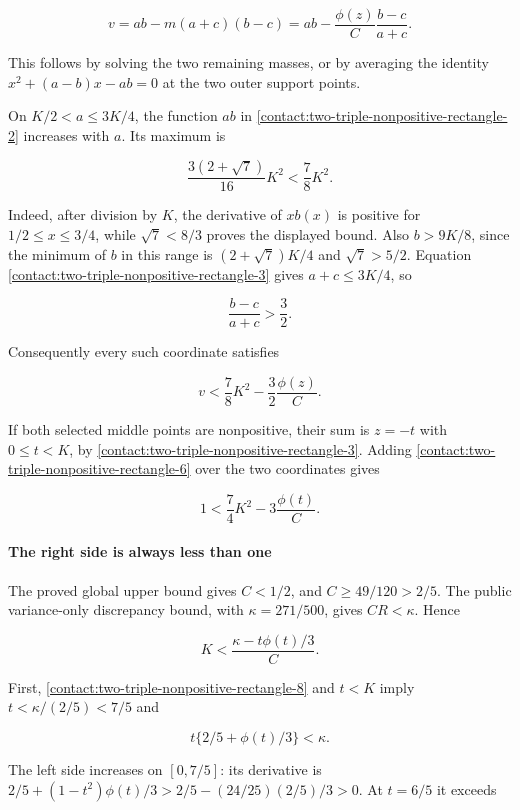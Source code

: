 \[
 v=ab-m(a+c)(b-c)
   =ab-\frac{\phi(z)}C\frac{b-c}{a+c}.
\tag{B.7.5}\label{contact:two-triple-nonpositive-rectangle-5}
\]

This follows by solving the two remaining masses, or by averaging
the identity $x^2+(a-b)x-ab=0$ at the two outer support points.

On $K/2<a\le 3K/4$, the function $ab$ in \eqref{contact:two-triple-nonpositive-rectangle-2} increases with $a$. Its
maximum is

\[
 \frac{3(2+\sqrt7)}{16}K^2<\frac78K^2.
\]

Indeed, after division by $K$, the derivative of $x b(x)$ is positive
for $1/2\le x\le 3/4$, while $\sqrt{7}<8/3$ proves the displayed bound.
Also $b>9K/8$, since the minimum of $b$ in this range is
$(2+\sqrt{7})K/4$ and $\sqrt{7}>5/2$. Equation \eqref{contact:two-triple-nonpositive-rectangle-3} gives
$a+c\le 3K/4$, so

\[
 \frac{b-c}{a+c}>\frac32.
\]

Consequently every such coordinate satisfies

\[
 \boxed{\quad v<\frac78K^2-\frac32\frac{\phi(z)}C.\quad}
\tag{B.7.6}\label{contact:two-triple-nonpositive-rectangle-6}
\]

If both selected middle points are nonpositive, their sum is $z=-t$
with $0\le t<K$, by \eqref{contact:two-triple-nonpositive-rectangle-3}. Adding \eqref{contact:two-triple-nonpositive-rectangle-6} over the two coordinates gives

\[
 1<\frac74K^2-3\frac{\phi(t)}C.
\tag{B.7.7}\label{contact:two-triple-nonpositive-rectangle-7}
\]

\paragraph{The right side is always less than one}

The proved global upper bound gives $C<1/2$, and $C\ge49/120>2/5$.
The public variance-only discrepancy bound, with
$\kappa=271/500$, gives $CR<\kappa$. Hence

\[
 K<\frac{\kappa-t\phi(t)/3}{C}.
\tag{B.7.8}\label{contact:two-triple-nonpositive-rectangle-8}
\]

First, \eqref{contact:two-triple-nonpositive-rectangle-8} and $t<K$ imply $t<\kappa/(2/5)<7/5$ and

\[
 t\{2/5+\phi(t)/3\}<\kappa.
\]

The left side increases on $[0,7/5]$: its derivative is
$2/5+(1-t^2)\phi(t)/3>2/5-(24/25)(2/5)/3>0$.
At $t=6/5$ it exceeds

